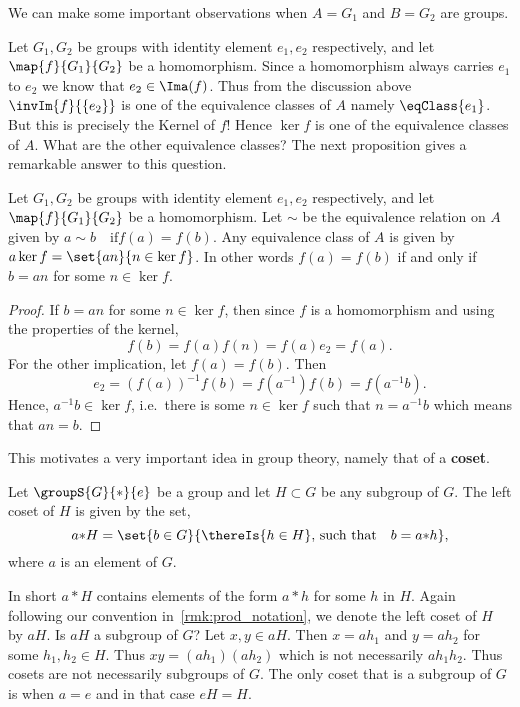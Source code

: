 We can make some important observations when $A = G_1$ and $B = G_2$ are groups.
\begin{Observation}
    Let $G_1,G_2$ be groups with identity element $e_1,e_2$ respectively, 
    and let $\map{f}{G_1}{G_2}$ be a homomorphism. Since a homomorphism always carries $e_1$ to $e_2$ we know
    that $e_2 \in \Ima(f)$. Thus from the discussion above $\invIm{f}{\lbrace e_2 \rbrace}$ is one of the
    equivalence classes of $A$ namely $\eqClass{e_1}$. But this is precisely the Kernel of $f$! Hence
    $\ker{f}$ is one of the equivalence classes of $A$. What are the other equivalence classes? The next
    proposition gives a remarkable answer to this question.
\end{Observation}
\begin{Proposition}\label{prop:hom_equiv_group}
    Let $G_1,G_2$ be groups with identity element $e_1,e_2$ respectively, 
    and let $\map{f}{G_1}{G_2}$ be a homomorphism. Let $\sim$ be the equivalence relation on $A$ given by $a\sim b
    \quad \text{if} f(a) = f(b)$. Any equivalence class of $A$ is given by $a\ker{f} = \set{an}{n\in\ker{f}}$.
    In other words $f(a) = f(b)$ if and only if $b = an$ for some $n\in \ker{f}$.
\end{Proposition}
\begin{proof}
    If $b = an$ for some $n \in \ker{f}$, then since $f$ is a homomorphism and using the properties of the
    kernel, \[f(b) = f(a)f(n) = f(a)e_2 = f(a).\]
    For the other implication, let $f(a) = f(b)$. Then 
    \[e_2 = {(f(a))}^{-1}f(b) = f(a^{-1})f(b) = f(a^{-1}b).\]
    Hence, $a^{-1}b \in \ker{f}$, i.e.~there is some $n \in \ker{f}$ such that $n = a^{-1}b$ which means that
    $an = b$.
\end{proof}

This motivates a very important idea in group theory, namely that of a \textbf{coset}.
\begin{Definition}[name=Left coset]
    Let $\groupS{G}{\ast}{e}$ be a group and let $H \subset G$ be any subgroup of $G$. 
    The left coset of $H$ is given by the set,
    \[a{\ast}H = \set{b \in G}{\thereIs{h\in H},\,\text{such that}\quad b = a{\ast}h},\]
    where $a$ is an element of $G$.
\end{Definition}
In short $a\ast H$ contains elements of the form $a\ast h$ for some $h$ in $H$. Again following our convention
in~\ref{rmk:prod_notation}, we denote the left coset of $H$ by $aH$.
Is $aH$ a subgroup of $G$? Let $x,y \in aH$. Then $x = ah_1$ and $y = ah_2$ for some $h_1,h_2 \in H$. Thus 
$xy = (ah_1)(ah_2)$ which is not necessarily $ah_1h_2$. Thus cosets are not necessarily subgroups of $G$. The
only coset that is a subgroup of $G$ is when $a = e$ and in that case $eH = H$. 


